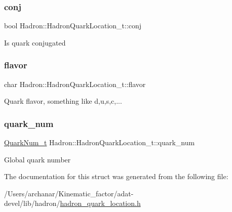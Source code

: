 \subsubsection{\texorpdfstring{conj}{conj}}
{\footnotesize\ttfamily bool Hadron\+::\+Hadron\+Quark\+Location\+\_\+t\+::conj}

Is quark conjugated \mbox{\label{structHadron_1_1HadronQuarkLocation__t_a31beaaffd8b2dec8d57b7020673e4e3d}} 
\subsubsection{\texorpdfstring{flavor}{flavor}}
{\footnotesize\ttfamily char Hadron\+::\+Hadron\+Quark\+Location\+\_\+t\+::flavor}

Quark flavor, something like d,u,s,c,... \mbox{\label{structHadron_1_1HadronQuarkLocation__t_ad4abb30a9e5f991c0eeeb4869457f8b6}} 
\subsubsection{\texorpdfstring{quark\_num}{quark\_num}}
{\footnotesize\ttfamily \mbox{\hyperlink{structHadron_1_1QuarkNum__t}{Quark\+Num\+\_\+t}} Hadron\+::\+Hadron\+Quark\+Location\+\_\+t\+::quark\+\_\+num}

Global quark number 

The documentation for this struct was generated from the following file\+:\begin{DoxyCompactItemize}
\item 
/\+Users/archanar/\+Kinematic\+\_\+factor/adat-\/devel/lib/hadron/\mbox{\hyperlink{adat-devel_2lib_2hadron_2hadron__quark__location_8h}{hadron\+\_\+quark\+\_\+location.\+h}}\end{DoxyCompactItemize}
